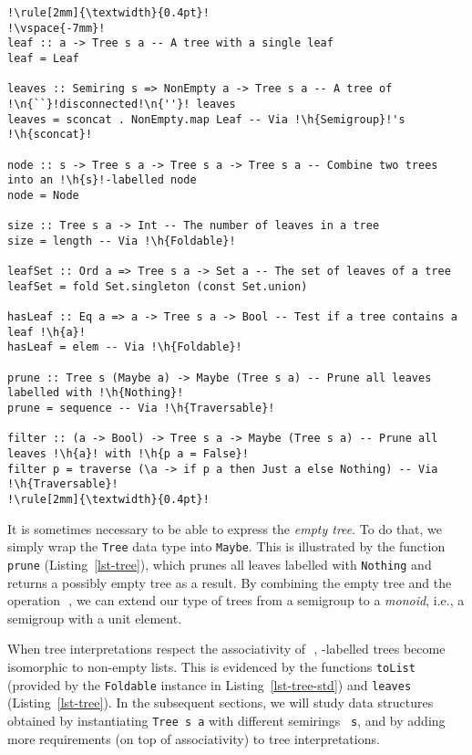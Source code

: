 \documentclass[crc,english]{programming}
\newcommand{\code}[1]{\lstinline[mathescape]|#1|}
\newcommand{\hcode}[1]{{\color{darkblue} \lstinline[keywordstyle={}]|#1|}} %
\newcommand{\h}[1]{{\itshape\color{grayblue}#1}} %
\newcommand{\n}[1]{{\itshape\color{graygreen}#1}} %
\newcommand{\zero}{\raisebox{-0.2mm}{\textcircled{\textsf{0}}}\xspace}
\newcommand{\dia}{\,\text{\raisebox{-0.3mm}{\Large $\diamond$}}\,}
\begin{document}
\begin{lstlisting}[float,label=lst-tree,xleftmargin=0pt,belowskip=-2mm,caption={
    A basic API for constructing and manipulating trees. We use the standard
    module \code{Data.L}\code{ist.N}\code{onEmpty} for representing non-empty
    lists, and \code{Data.S}\code{et} for sets.}]
!\rule[2mm]{\textwidth}{0.4pt}!
!\vspace{-7mm}!
leaf :: a -> Tree s a -- A tree with a single leaf
leaf = Leaf

leaves :: Semiring s => NonEmpty a -> Tree s a -- A tree of !\n{``}!disconnected!\n{''}! leaves
leaves = sconcat . NonEmpty.map Leaf -- Via !\h{Semigroup}!'s !\h{sconcat}!

node :: s -> Tree s a -> Tree s a -> Tree s a -- Combine two trees into an !\h{s}!-labelled node
node = Node

size :: Tree s a -> Int -- The number of leaves in a tree
size = length -- Via !\h{Foldable}!

leafSet :: Ord a => Tree s a -> Set a -- The set of leaves of a tree
leafSet = fold Set.singleton (const Set.union)

hasLeaf :: Eq a => a -> Tree s a -> Bool -- Test if a tree contains a leaf !\h{a}!
hasLeaf = elem -- Via !\h{Foldable}!

prune :: Tree s (Maybe a) -> Maybe (Tree s a) -- Prune all leaves labelled with !\h{Nothing}!
prune = sequence -- Via !\h{Traversable}!

filter :: (a -> Bool) -> Tree s a -> Maybe (Tree s a) -- Prune all leaves !\h{a}! with !\h{p a = False}!
filter p = traverse (\a -> if p a then Just a else Nothing) -- Via !\h{Traversable}!
!\rule[2mm]{\textwidth}{0.4pt}!
\end{lstlisting}

\noindent
It is sometimes necessary to be able to express the \emph{empty tree}. To do
that, we simply wrap the \hcode{Tree} data type into \hcode{Maybe}. This is
illustrated by the function \hcode{prune} (Listing~\ref{lst-tree}), which prunes
all leaves labelled with \hcode{Nothing} and returns a possibly empty tree as a
result. By combining the empty tree and the operation \dia, we can extend our
type of trees from a semigroup to a \emph{monoid}, i.e., a semigroup with a unit
element.

When tree interpretations respect the associativity of \dia, \zero-labelled
trees become isomorphic to non-empty lists. This is evidenced by the functions
\hcode{toList} (provided by the \hcode{Foldable} instance in
Listing~\ref{lst-tree-std}) and \hcode{leaves} (Listing~\ref{lst-tree}). In the
subsequent sections, we will study data structures obtained by instantiating
\hcode{Tree s a} with different semirings~\hcode{s}, and by adding more
requirements (on top of associativity) to tree interpretations.
\end{document}
